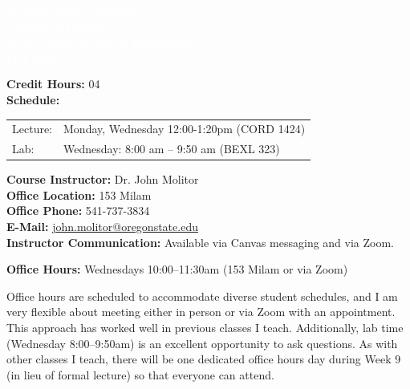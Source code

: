 \documentclass[11pt]{article}
\title{}
\author{}
\date{}
\begin{document}
\begin{tcolorbox}[colback=osaorange,colframe=black,boxrule=2pt,arc=0pt,left=6pt,right=6pt,top=10pt,bottom=10pt]
\centering
\textcolor{white}{\textbf{\large Oregon State University}}\\
\textcolor{white}{\textbf{\large College of Health}}\\
\textcolor{white}{\textbf{\large H524 Introduction to Biostatistics}}\\
\textcolor{white}{\textbf{\large Fall 2025}}
\end{tcolorbox}

\vspace{8pt}

\noindent\textbf{Credit Hours:} 04\\
\textbf{Schedule:}

\vspace{4pt}

\begin{tabular}{@{}ll@{}}
Lecture: & Monday, Wednesday 12:00-1:20pm (CORD 1424)\\
Lab: & Wednesday: 8:00 am -- 9:50 am (BEXL 323)
\end{tabular}

\vspace{8pt}

\noindent\textbf{Course Instructor:} Dr. John Molitor\\
\textbf{Office Location:} 153 Milam\\
\textbf{Office Phone:} 541-737-3834\\
\textbf{E-Mail:} \href{mailto:john.molitor@oregonstate.edu}{john.molitor@oregonstate.edu}\\
\textbf{Instructor Communication:} Available via Canvas messaging and via Zoom.

\vspace{8pt}

\noindent\textbf{Office Hours:} Wednesdays 10:00--11:30am (153 Milam or via Zoom)

Office hours are scheduled to accommodate diverse student schedules, and I am very flexible about meeting either in person or via Zoom with an appointment. This approach has worked well in previous classes I teach. Additionally, lab time (Wednesday 8:00--9:50am) is an excellent opportunity to ask questions. As with other classes I teach, there will be one dedicated office hours day during Week 9 (in lieu of formal lecture) so that everyone can attend.

\vspace{8pt}
\end{document}
